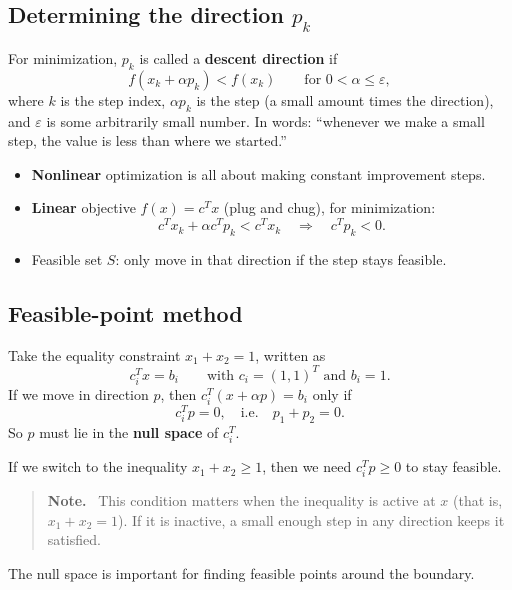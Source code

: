\documentclass[11pt]{article}
\newenvironment{aside}{\begin{quote}\small\color{black!65}\textbf{Note.}\ }{\end{quote}}
\begin{document}
\subsection{Determining the direction \texorpdfstring{$p_k$}{p\_k}}

For minimization, $p_k$ is called a \textbf{descent direction} if
\[
    f(x_k + \alpha p_k) < f(x_k) \qquad \text{for } 0 < \alpha \le \varepsilon,
\]
where $k$ is the step index, $\alpha p_k$ is the step (a small amount times the
direction), and $\varepsilon$ is some arbitrarily small number. In words:
``whenever we make a small step, the value is less than where we started.''

\begin{itemize}
    \item \textbf{Nonlinear} optimization is all about making constant improvement steps.
    \item \textbf{Linear} objective $f(x) = c^T x$ (plug and chug), for minimization:
    \[
        c^T x_k + \alpha c^T p_k < c^T x_k \quad\Longrightarrow\quad c^T p_k < 0.
    \]
    \item Feasible set $S$: only move in that direction if the step stays feasible.
\end{itemize}

\subsection{Feasible-point method}

Take the equality constraint $x_1 + x_2 = 1$, written as
\[
    c_i^T x = b_i \qquad \text{with } c_i = (1, 1)^T \text{ and } b_i = 1.
\]
If we move in direction $p$, then $c_i^T(x + \alpha p) = b_i$ only if
\[
    c_i^T p = 0, \quad\text{i.e.}\quad p_1 + p_2 = 0.
\]
So $p$ must lie in the \textbf{null space} of $c_i^T$.

If we switch to the inequality $x_1 + x_2 \ge 1$, then we need $c_i^T p \ge 0$ to
stay feasible.

\begin{aside}
This condition matters when the inequality is active at $x$ (that is,
$x_1 + x_2 = 1$). If it is inactive, a small enough step in any direction keeps it
satisfied.
\end{aside}

The null space is important for finding feasible points around the boundary.
\end{document}
